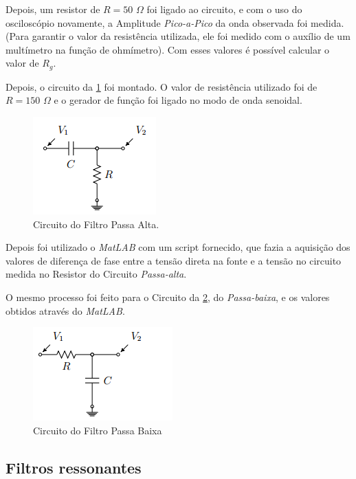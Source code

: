 \documentclass[11pt,a4paper]{article}
\begin{document}
Depois, um resistor de $R=50$ $\Omega$ foi ligado ao circuito, e com o uso do osciloscópio novamente, a Amplitude \textit{Pico-a-Pico} da onda observada foi medida. (Para garantir o valor da resistência utilizada, ele foi medido com o auxílio de um multímetro na função de ohmímetro). Com esses valores é possível calcular o valor de $R_g $.

Depois, o circuito da \cref{Circuito1.2a} foi montado. O valor de resistência utilizado foi de $R=150$ $\Omega$  e o gerador de função foi ligado no modo de onda senoidal. 

    \begin{figure}[!htb]
    \centering
    \includegraphics[scale=0.7]{Circuito1-2a.png}
    \caption{Circuito do Filtro Passa Alta.}
    \label{Circuito1.2a}
    \end{figure}

Depois foi utilizado o \textit{MatLAB} com um script fornecido, que fazia a aquisição dos valores de diferença de fase entre a tensão direta na fonte e a tensão no circuito medida no Resistor do Circuito \textit{Passa-alta}.

O mesmo processo foi feito para o Circuito da \cref{Circuito1.2b}, do \textit{Passa-baixa}, e os valores obtidos através do \textit{MatLAB}.

    \begin{figure}[!htb]
    \centering
    \includegraphics[scale=0.7]{Circuito1-2b.png}
    \caption{Circuito do Filtro Passa Baixa}
    \label{Circuito1.2b}
    \end{figure}

\subsection{Filtros ressonantes}
\end{document}
